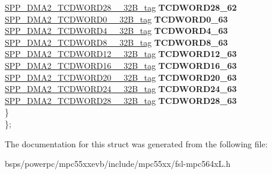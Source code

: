 \begin{DoxyCompactItemize}
\begin{tabbing}
\>\>\mbox{\hyperlink{unionSPP__DMA2__TCDWORD28____32B__tag}{SPP\_DMA2\_TCDWORD28\_\_32B\_tag}} {\bfseries TCDWORD28\_62}\\
\>\>\mbox{\hyperlink{unionSPP__DMA2__TCDWORD0____32B__tag}{SPP\_DMA2\_TCDWORD0\_\_32B\_tag}} {\bfseries TCDWORD0\_63}\\
\>\>\mbox{\hyperlink{unionSPP__DMA2__TCDWORD4____32B__tag}{SPP\_DMA2\_TCDWORD4\_\_32B\_tag}} {\bfseries TCDWORD4\_63}\\
\>\>\mbox{\hyperlink{unionSPP__DMA2__TCDWORD8____32B__tag}{SPP\_DMA2\_TCDWORD8\_\_32B\_tag}} {\bfseries TCDWORD8\_63}\\
\>\>\mbox{\hyperlink{unionSPP__DMA2__TCDWORD12____32B__tag}{SPP\_DMA2\_TCDWORD12\_\_32B\_tag}} {\bfseries TCDWORD12\_63}\\
\>\>\mbox{\hyperlink{unionSPP__DMA2__TCDWORD16____32B__tag}{SPP\_DMA2\_TCDWORD16\_\_32B\_tag}} {\bfseries TCDWORD16\_63}\\
\>\>\mbox{\hyperlink{unionSPP__DMA2__TCDWORD20____32B__tag}{SPP\_DMA2\_TCDWORD20\_\_32B\_tag}} {\bfseries TCDWORD20\_63}\\
\>\>\mbox{\hyperlink{unionSPP__DMA2__TCDWORD24____32B__tag}{SPP\_DMA2\_TCDWORD24\_\_32B\_tag}} {\bfseries TCDWORD24\_63}\\
\>\>\mbox{\hyperlink{unionSPP__DMA2__TCDWORD28____32B__tag}{SPP\_DMA2\_TCDWORD28\_\_32B\_tag}} {\bfseries TCDWORD28\_63}\\
\>\} \\
\}; \\

\end{tabbing}\end{DoxyCompactItemize}


The documentation for this struct was generated from the following file\+:\begin{DoxyCompactItemize}
\item 
bsps/powerpc/mpc55xxevb/include/mpc55xx/fsl-\/mpc564x\+L.\+h\end{DoxyCompactItemize}
